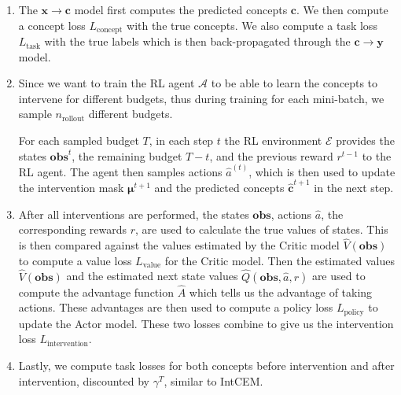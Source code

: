 \begin{enumerate}
    \item The $\mathbf{x} \to \mathbf{c}$ model first computes the predicted concepts $\mathbf{c}$.
    We then compute a concept loss $L_{\text{concept}}$ with the true concepts.
    We also compute a task loss $L_{\text{task}}$ with the true labels
    which is then 
    back-propagated through the $\mathbf{c} \to \mathbf{y}$ model.
    \item Since we want to train the RL agent $\mathcal{A}$ to be able to learn 
    the concepts to intervene for different budgets, thus during training 
    for each mini-batch, we sample $n_{\text{rollout}}$ different budgets.

    For each sampled budget $T$, 
    in each step $t$
    the RL environment $\mathcal{E}$ provides
    the states $\textbf{obs}^t$, the remaining budget $T - t$, 
    and the previous reward $r^{t-1}$ to the RL agent. The agent then samples actions
    $\hat{a}^{(t)}$, which is then used to update the intervention mask $\bm{\mu}^{t+1}$
    and the predicted concepts $\hat{\mathbf{c}}^{t+1}$ in the next step.

    \item After all interventions are performed, the states $\textbf{obs}$,
    actions $\hat{a}$,
    the corresponding rewards $r$, are used to calculate the true values of states.
    This is then compared against the values estimated by the Critic model
    $\hat{V}(\textbf{obs})$
    to compute a value loss $L_{\text{value}}$ for the Critic model.
    Then the estimated values $\hat{V}(\textbf{obs})$ and the estimated 
    next state values $\hat{Q}(\textbf{obs}, \hat{a}, r)$
    are used to compute the advantage function $\hat{A}$ which tells us
    the advantage of taking actions. These advantages are then used to compute
    a policy loss $L_{\text{policy}}$ to update the Actor model.
    These two losses combine to give us the intervention loss $L_{\text{intervention}}$.
    \item Lastly, we compute task losses for both concepts before intervention and after intervention,
    discounted by $\gamma^T$, similar to IntCEM.
\end{enumerate}

